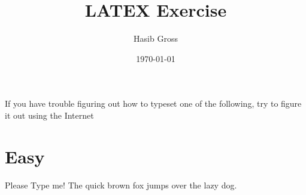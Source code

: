 \documentclass{article}
\title{LATEX Exercise}
\author{Hasib Gross}
\date{\today}
\begin{document}
\maketitle
If you have trouble figuring out how to typeset one of the following,
try to figure it out using the Internet
\section{Easy}
Please Type me! The quick brown fox jumps over the lazy dog.
\end{document}
